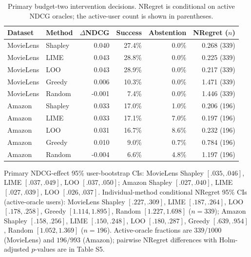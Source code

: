 \begin{table}[t]\centering\small
\caption{Primary budget-two intervention decisions. NRegret is conditional on active NDCG oracles; the active-user count is shown in parentheses.}
\label{tab:intervention-outcomes}
\begin{tabular}{llrrrr}
\toprule
Dataset & Method & $\Delta$NDCG & Success & Abstention & NRegret ($n$) \\
\midrule
MovieLens & Shapley & 0.040 & 27.4\% & 0.0\% & 0.268 (339) \\
MovieLens & LIME & 0.043 & 28.8\% & 0.0\% & 0.225 (339) \\
MovieLens & LOO & 0.043 & 28.9\% & 0.0\% & 0.217 (339) \\
MovieLens & Greedy & 0.006 & 10.3\% & 0.0\% & 1.471 (339) \\
MovieLens & Random & -0.001 & 7.4\% & 0.0\% & 1.446 (339) \\
\midrule
Amazon & Shapley & 0.033 & 17.0\% & 1.0\% & 0.206 (196) \\
Amazon & LIME & 0.033 & 17.1\% & 7.0\% & 0.197 (196) \\
Amazon & LOO & 0.031 & 16.7\% & 8.6\% & 0.232 (196) \\
Amazon & Greedy & 0.010 & 9.0\% & 0.7\% & 0.784 (196) \\
Amazon & Random & -0.004 & 6.6\% & 4.8\% & 1.197 (196) \\
\bottomrule
\end{tabular}
\end{table}

\noindent Primary NDCG-effect 95\% user-bootstrap CIs: MovieLens Shapley $[.035,.046]$, LIME $[.037,.049]$, LOO $[.037,.050]$; Amazon Shapley $[.027,.040]$, LIME $[.027,.039]$, LOO $[.026,.037]$. Individual-method conditional NRegret 95\% CIs (active-oracle users): MovieLens Shapley $[.227,.309]$, LIME $[.187,.264]$, LOO $[.178,.258]$, Greedy $[1.114,1.895]$, Random $[1.227,1.698]$ ($n=339$); Amazon Shapley $[.158,.256]$, LIME $[.150,.248]$, LOO $[.180,.287]$, Greedy $[.639,.954]$, Random $[1.052,1.369]$ ($n=196$). Active-oracle fractions are $339/1000$ (MovieLens) and $196/993$ (Amazon); pairwise NRegret differences with Holm-adjusted $p$-values are in Table S5.
